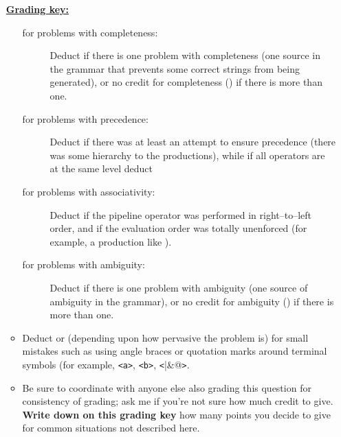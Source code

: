 \documentclass[11pt,fleqn]{article}
\begin{document}
\begin{enumerate}
\begin{info}{\textbf{\underline{Grading key:}}}
\begin{itemize}
\begin{description}
                      \item[for problems with completeness:] Deduct 
                            if there is one problem with completeness (one
                            source in the grammar that prevents some correct
                            strings from being generated), or no credit for
                            completeness () if there is more than one.

                      \item[for problems with precedence:] Deduct  if
                            there was at least an attempt to ensure precedence
                            (there was some hierarchy to the productions),
                            while if all operators are at the same level
                            deduct 

                      \item[for problems with associativity:] Deduct 
                            if the pipeline operator was performed in
                            right--to--left order, and  if the
                            evaluation order was totally unenforced (for
                            example, a production like
                            ).

                      \item[for problems with ambiguity:] Deduct  if
                            there is one problem with ambiguity (one source of
                            ambiguity in the grammar), or no credit for
                            ambiguity () if there is more than one.

                    \end{description}

                    \vspace{-0mm}

              \item Deduct  or  (depending upon how pervasive
                    the problem is) for small mistakes such as using angle
                    braces or quotation marks around terminal symbols (for
                    example, \texttt{<a>}, \texttt{<b>},
                    \texttt{<}\verb@|&@\texttt{>}.

              \item Be sure to coordinate with anyone else also grading this
                    question for consistency of grading; ask me if you're
                    not sure how much credit to give.  \textbf{Write down on
                    this grading key} how many points you decide to give
                    for common situations not described here.


\end{itemize}
\end{info}
\end{enumerate}
\end{document}
